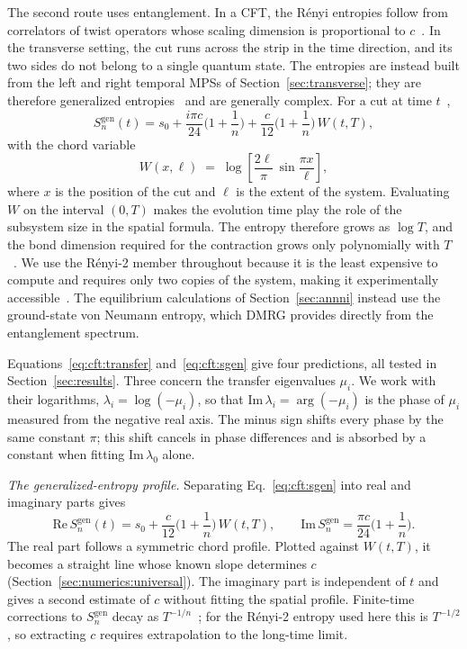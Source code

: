 The second route uses entanglement. In a \ac{CFT}, the R\'enyi entropies follow from correlators of twist operators whose scaling dimension is proportional to $c$~\cite{calabrese_cardy2004}. In the transverse setting, the cut runs across the strip in the time direction, and its two sides do not belong to a single quantum state. The entropies are instead built from the left and right temporal \acp{MPS} of Section~\ref{sec:transverse}; they are therefore generalized entropies~\cite{doi2023} and are generally complex. For a cut at time $t$~\cite{carignano_tagliacozzo2025,boucomas2026},
\begin{equation}
  S_n^{\mathrm{gen}}(t) = s_0 + \frac{i\pi c}{24}\Big(1+\frac{1}{n}\Big)
  + \frac{c}{12}\Big(1+\frac{1}{n}\Big)\,W(t,T),
  \label{eq:cft:sgen}
\end{equation}
with the chord variable
\begin{equation}
  W(x,\ell) \;=\; \log\!\left[\frac{2\ell}{\pi}\,\sin\frac{\pi x}{\ell}\right],
  \label{eq:chord}
\end{equation}
where $x$ is the position of the cut and $\ell$ is the extent of the system. Evaluating $W$ on the interval $(0,T)$ makes the evolution time play the role of the subsystem size in the spatial formula. The entropy therefore grows as $\log T$, and the bond dimension required for the contraction grows only polynomially with $T$~\cite{schuch2008,paeckel2019}. We use the R\'enyi-2 member throughout because it is the least expensive to compute and requires only two copies of the system, making it experimentally accessible~\cite{boucomas2026measuring}. The equilibrium calculations of Section~\ref{sec:annni} instead use the ground-state von Neumann entropy, which \ac{DMRG} provides directly from the entanglement spectrum.

Equations~\eqref{eq:cft:transfer} and~\eqref{eq:cft:sgen} give four predictions, all tested in Section~\ref{sec:results}. Three concern the transfer eigenvalues $\mu_i$. We work with their logarithms, $\lambda_i = \log(-\mu_i)$, so that $\mathrm{Im}\,\lambda_i = \arg(-\mu_i)$ is the phase of $\mu_i$ measured from the negative real axis. The minus sign shifts every phase by the same constant $\pi$; this shift cancels in phase differences and is absorbed by a constant when fitting $\mathrm{Im}\,\lambda_0$ alone.

\textit{The generalized-entropy profile.} Separating Eq.~\eqref{eq:cft:sgen} into real and imaginary parts gives
\begin{equation}
  \mathrm{Re}\,S_n^{\mathrm{gen}}(t) = s_0 + \frac{c}{12}\Big(1+\frac{1}{n}\Big)\,W(t,T),
  \qquad
  \mathrm{Im}\,S_n^{\mathrm{gen}} = \frac{\pi c}{24}\Big(1+\frac{1}{n}\Big).
  \label{eq:cft:chord}
\end{equation}
The real part follows a symmetric chord profile. Plotted against $W(t,T)$, it becomes a straight line whose known slope determines $c$ (Section~\ref{sec:numerics:universal}). The imaginary part is independent of $t$ and gives a second estimate of $c$ without fitting the spatial profile. Finite-time corrections to $S_n^{\mathrm{gen}}$ decay as $T^{-1/n}$~\cite{boucomas2026}; for the R\'enyi-2 entropy used here this is $T^{-1/2}$, so extracting $c$ requires extrapolation to the long-time limit.


